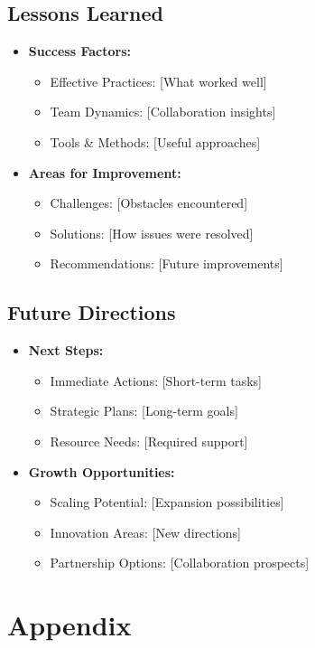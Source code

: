 \documentclass{article}
\begin{document}
\subsection{Lessons Learned}
\begin{itemize}
    \item \textbf{Success Factors:}
    \begin{itemize}
        \item Effective Practices: [What worked well]
        \item Team Dynamics: [Collaboration insights]
        \item Tools \& Methods: [Useful approaches]
    \end{itemize}
    \item \textbf{Areas for Improvement:}
    \begin{itemize}
        \item Challenges: [Obstacles encountered]
        \item Solutions: [How issues were resolved]
        \item Recommendations: [Future improvements]
    \end{itemize}
\end{itemize}
\subsection{Future Directions}
\begin{itemize}
    \item \textbf{Next Steps:}
    \begin{itemize}
        \item Immediate Actions: [Short-term tasks]
        \item Strategic Plans: [Long-term goals]
        \item Resource Needs: [Required support]
    \end{itemize}
    \item \textbf{Growth Opportunities:}
    \begin{itemize}
        \item Scaling Potential: [Expansion possibilities]
        \item Innovation Areas: [New directions]
        \item Partnership Options: [Collaboration prospects]
    \end{itemize}
\end{itemize}
\section{Appendix}
\end{document}
